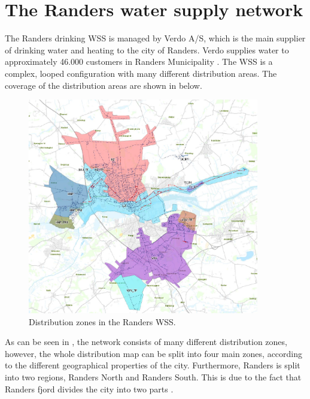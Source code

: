 \newpage

\section{The Randers water supply network}
\label{the_randers_water_supply_network}

The Randers drinking WSS is managed by Verdo A/S, which is the main supplier of drinking water and heating to the city of Randers. Verdo supplies water to approximately 46.000 customers in Randers Municipality \cite{verdo}. The WSS is a complex, looped configuration with many different distribution areas. The coverage of the distribution areas are shown in  below.

\begin{figure}[H]
\centering
\includegraphics[width=0.9\textwidth]{report/pictures/level_zones}
\caption{Distribution zones in the Randers WSS.}
\label{fig:level_zones}
\end{figure}

As can be seen in , the network consists of many different distribution zones, however, the whole distribution map can be split into four main zones, according to the different geographical properties of the city. Furthermore, Randers is split into two regions, Randers North and Randers South. This is due to the fact that Randers fjord divides the city into two parts\cite{verdo} . 

